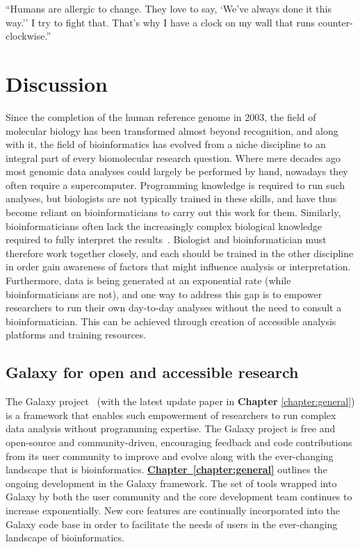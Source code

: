 \begin{savequote}[75mm]
``Humans are allergic to change. They love to say, `We've always done it this way.'' I try to fight that. That's why I have a clock on my wall that runs counter-clockwise.''
\end{savequote}

\chapter{Discussion}\label{discussion}
\setcounter{figure}{-1}
\setcounter{table}{-1}
\setcounter{section}{-1}
\setcounter{NAT@ctr}{-1}

Since the completion of the human reference genome in 2003, the field of molecular biology has been transformed almost beyond recognition, and along with it, the field of bioinformatics has evolved from a niche discipline to an integral part of every biomolecular research question. Where mere decades ago most genomic data analyses could largely be performed by hand, nowadays they often require a supercomputer. Programming knowledge is required to run such analyses, but biologists are not typically trained in these skills, and have thus become reliant on bioinformaticians to carry out this work for them. Similarly, bioinformaticians often lack the increasingly complex biological knowledge required to fully interpret the results~\cite{preeyanon2014reproducible}. Biologist and bioinformatician must therefore work together closely, and each should be trained in the other discipline in order gain awareness of factors that might influence analysis or interpretation. Furthermore, data is being generated at an exponential rate (while bioinformaticians are not), and one way to address this gap is to empower researchers to run their own day-to-day analyses without the need to consult a bioinformatician. This can be achieved through creation of accessible analysis platforms and training resources.


\section{Galaxy for open and accessible research}
The Galaxy project~\cite{giardine2005galaxy,blankenberg2010galaxy,afgan2016galaxy} (with the latest update paper in \textbf{Chapter} \ref{chapter:general}) is a framework that enables such empowerment of researchers to run complex data analysis without programming expertise. The Galaxy project is free and open-source and community-driven, encouraging feedback and code contributions from its user community to improve and evolve along with the ever-changing landscape that is bioinformatics. \hyperref[chapter:galaxy]{\textbf{Chapter~\ref{chapter:general}}} outlines the ongoing development in the Galaxy framework. The set of tools wrapped into Galaxy by both the user community and the core development team continues to increase exponentially. New core features are continually incorporated into the Galaxy code base in order to facilitate the needs of users in the ever-changing landscape of bioinformatics.

